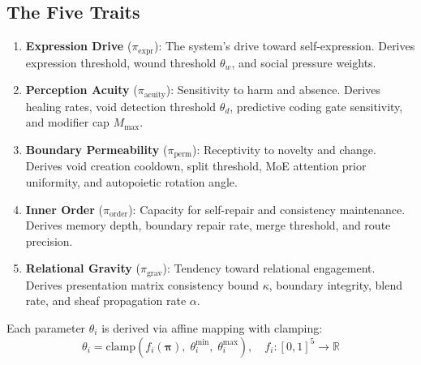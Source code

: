 \documentclass[11pt]{article}
\begin{document}
\subsection{The Five Traits}

\begin{enumerate}[leftmargin=*]
\item \textbf{Expression Drive} ($\pi_{\text{expr}}$): The system's drive toward self-expression. Derives expression threshold, wound threshold $\theta_w$, and social pressure weights.

\item \textbf{Perception Acuity} ($\pi_{\text{acuity}}$): Sensitivity to harm and absence. Derives healing rates, void detection threshold $\theta_d$, predictive coding gate sensitivity, and modifier cap $M_{\max}$.

\item \textbf{Boundary Permeability} ($\pi_{\text{perm}}$): Receptivity to novelty and change. Derives void creation cooldown, split threshold, MoE attention prior uniformity, and autopoietic rotation angle.

\item \textbf{Inner Order} ($\pi_{\text{order}}$): Capacity for self-repair and consistency maintenance. Derives memory depth, boundary repair rate, merge threshold, and route precision.

\item \textbf{Relational Gravity} ($\pi_{\text{grav}}$): Tendency toward relational engagement. Derives presentation matrix consistency bound $\kappa$, boundary integrity, blend rate, and sheaf propagation rate $\alpha$.
\end{enumerate}

Each parameter $\theta_i$ is derived via affine mapping with clamping:
\begin{equation}
\theta_i = \text{clamp}(f_i(\boldsymbol{\pi}),\; \theta_i^{\min},\; \theta_i^{\max}), \quad f_i: [0,1]^5 \to \mathbb{R}
\end{equation}
\end{document}
